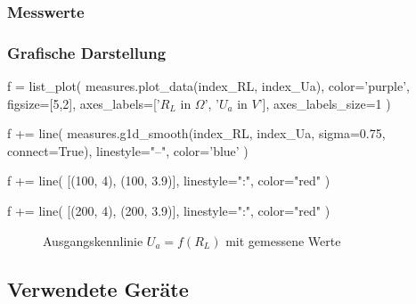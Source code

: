 \subsubsection{Messwerte}

\begin{center}
    \renewcommand{\arraystretch}{1.2}
\end{center}

\subsubsection{Grafische Darstellung}

\begin{sagesilent}
    f = list_plot(
        measures.plot_data(index_RL, index_Ua),
        color='purple',
        figsize=[5,2],
        axes_labels=['$R_L$ in $\Omega$', '$U_a$ in $V$'],
        axes_labels_size=1
    )

    f += line(
        measures.g1d_smooth(index_RL, index_Ua, sigma=0.75, connect=True),
        linestyle="--",
        color='blue'
    )

    f += line(
        [(100, 4), (100, 3.9)],
        linestyle=":",
        color="red"
    )

    f += line(
        [(200, 4), (200, 3.9)],
        linestyle=":",
        color="red"
    )
\end{sagesilent}

\begin{figure}[H]
    \centering
    \caption{Ausgangskennlinie \textbf{$U_{a} = f(R_L)$} mit gemessene Werte}
\end{figure}

\subsection{Verwendete Geräte}

\medskip

\begin{devicelist}
\end{devicelist}